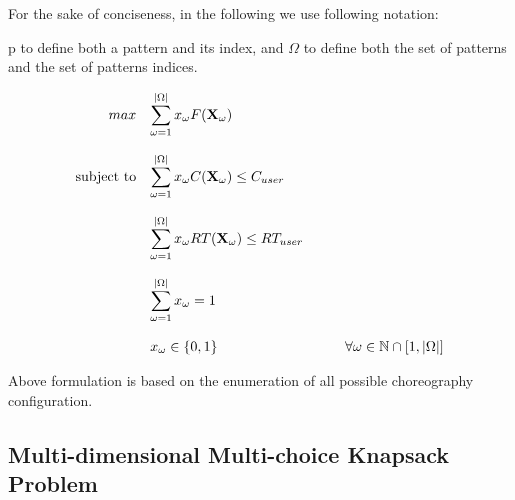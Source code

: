 For the sake of conciseness, in the following we use following notation: 

p to define both a pattern and its index, and $\Omega$ to define both the set of patterns and the
set of patterns indices.



\begin{equation}
	\begin{array} {rll} 
		\displaystyle max & \displaystyle \sum_{\omega = 1}^{|\Omega|} x_{\omega} F(\textbf{X}_{\omega}) \\\\
		
		\text{subject to} & \displaystyle \sum_{\omega = 1}^{|\Omega|} x_{\omega} C(\textbf{X}_{\omega}) \leq C_{user} \\\\
		
		& \displaystyle \sum_{\omega = 1}^{|\Omega|} x_{\omega} RT(\textbf{X}_{\omega}) \leq RT_{user} \\\\ 
		             
		& \displaystyle \sum_{\omega = 1}^{|\Omega|} x_{\omega} = 1 & \\\\
		
		
		& x_{\omega} \in \lbrace 0, 1 \rbrace & \qquad \forall \omega \in \mathbb{N} \cap [1,|\Omega|]
	\end{array}
\end{equation}

Above formulation is based on the enumeration of all possible choreography configuration.







\subsection{Multi-dimensional Multi-choice Knapsack Problem}


